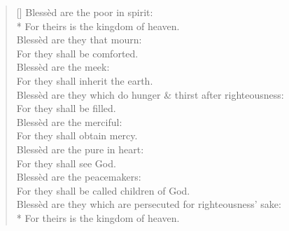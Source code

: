 \documentclass[MAIN]{subfiles}
\begin{document}
\settowidth{\versewidth}{\vin For theirs is the kingdom of heaven.}
\begin{verse}[\versewidth]
{\color{red} Bless\`ed are the poor in spirit:}\\*
{\color{red} \vin For theirs is the kingdom of heaven.}\\
{\color{red} Bless\`ed are they that mourn:}\\
{\color{red} \vin For they shall be comforted.}\\
{\color{red} Bless\`ed are the meek:}\\
{\color{red} \vin For they shall inherit the earth.}\\
{\color{red} Bless\`ed are they which do hunger \& thirst after righteousness:}\\
{\color{red} \vin For they shall be filled.}\\
{\color{red} Bless\`ed are the merciful:}\\
{\color{red} \vin For they shall obtain mercy.}\\
{\color{red} Bless\`ed are the pure in heart:}\\
{\color{red} \vin For they shall see God.}\\
{\color{red} Bless\`ed are the peacemakers:}\\
{\color{red} \vin For they shall be called children of God.}\\
{\color{red} Bless\`ed are they which are persecuted for righteousness' sake:}\\*
{\color{red} \vin For theirs is the kingdom of heaven.}
\end{verse}
\end{document}

